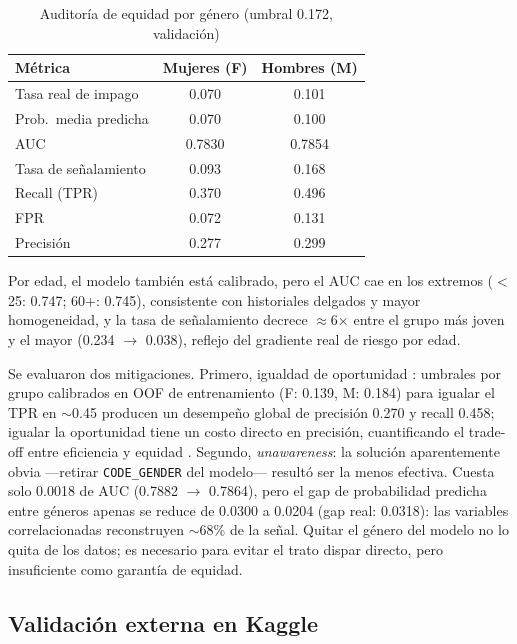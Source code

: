 \documentclass[journal]{IEEEtran}
\begin{document}
\begin{table}[!t]
\caption{Auditoría de equidad por género (umbral 0.172, validación)}
\label{tab:fairness}
\centering
\small
\begin{tabular}{lcc}
\toprule
Métrica & Mujeres (F) & Hombres (M) \\
\midrule
Tasa real de impago & 0.070 & 0.101 \\
Prob.\ media predicha & 0.070 & 0.100 \\
AUC & 0.7830 & 0.7854 \\
Tasa de señalamiento & 0.093 & 0.168 \\
Recall (TPR) & 0.370 & 0.496 \\
FPR & 0.072 & 0.131 \\
Precisión & 0.277 & 0.299 \\
\bottomrule
\end{tabular}
\end{table}

Por edad, el modelo también está calibrado, pero el AUC cae en los extremos ($<$25: 0.747; 60+: 0.745), consistente con historiales delgados y mayor homogeneidad, y la tasa de señalamiento decrece $\approx$6$\times$ entre el grupo más joven y el mayor (0.234 $\rightarrow$ 0.038), reflejo del gradiente real de riesgo por edad.

Se evaluaron dos mitigaciones. Primero, igualdad de oportunidad \cite{hardt2016}: umbrales por grupo calibrados en OOF de entrenamiento (F: 0.139, M: 0.184) para igualar el TPR en $\sim$0.45 producen un desempeño global de precisión 0.270 y recall 0.458; igualar la oportunidad tiene un costo directo en precisión, cuantificando el trade-off entre eficiencia y equidad \cite{kozodoi2022}. Segundo, \textit{unawareness}: la solución aparentemente obvia ---retirar \texttt{CODE\_GENDER} del modelo--- resultó ser la menos efectiva. Cuesta solo 0.0018 de AUC (0.7882 $\rightarrow$ 0.7864), pero el gap de probabilidad predicha entre géneros apenas se reduce de 0.0300 a 0.0204 (gap real: 0.0318): las variables correlacionadas reconstruyen $\sim$68\% de la señal. Quitar el género del modelo no lo quita de los datos; es necesario para evitar el trato dispar directo, pero insuficiente como garantía de equidad.

\subsection{Validación externa en Kaggle}
\end{document}
